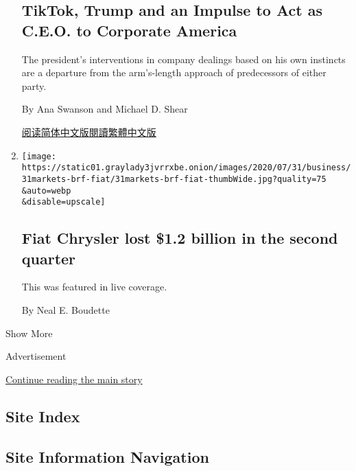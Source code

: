 \begin{enumerate}
{  \subsection{TikTok, Trump and an Impulse to Act as C.E.O. to Corporate
  America}\label{tiktok-trump-and-an-impulse-to-act-as-ceo-to-corporate-america}}

  The president's interventions in company dealings based on his own
  instincts are a departure from the arm's-length approach of
  predecessors of either party.

  By Ana Swanson and Michael D. Shear

  \href{https://cn.nytimes3xbfgragh.onion/business/20200804/trump-tiktok-china-business/}{阅读简体中文版}\href{https://cn.nytimes3xbfgragh.onion/business/20200804/trump-tiktok-china-business/zh-hant/}{閱讀繁體中文版}
\item
  \href{/live/2020/07/31/business/stock-market-today-coronavirus/fiat-chrysler-lost-1-2-billion-in-the-second-quarter}{}

  \texttt{[image: https://static01.graylady3jvrrxbe.onion/images/2020/07/31/business/31markets-brf-fiat/31markets-brf-fiat-thumbWide.jpg?quality=75\\\&auto=webp\\\&disable=upscale]}

  \hypertarget{fiat-chrysler-lost-12-billion-in-the-second-quarter}{%
  \subsection{Fiat Chrysler lost \$1.2 billion in the second
  quarter}\label{fiat-chrysler-lost-12-billion-in-the-second-quarter}}

  This was featured in live coverage.

  By Neal E. Boudette
\end{enumerate}

Show More

Advertisement

\protect\hyperlink{after-mid2}{Continue reading the main story}

\hypertarget{site-index}{%
\subsection{Site Index}\label{site-index}}

\hypertarget{site-information-navigation}{%
\subsection{Site Information
Navigation}\label{site-information-navigation}}

